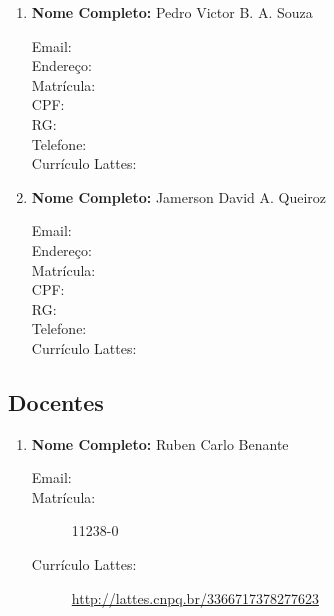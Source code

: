 \documentclass[a4paper,12pt]{article} %
\begin{document}
\begin{enumerate}
    \item \textbf{Nome Completo:} Pedro Victor B. A. Souza
    \begin{description}
        \item [Email:] 
        \item [Endereço:]
        \item [Matrícula:]
        \item [CPF:]
        \item [RG:]
        \item [Telefone:]
        \item [Currículo Lattes:]
    \end{description}

    \item \textbf{Nome Completo:} Jamerson David A. Queiroz
    \begin{description}
        \item [Email:] 
        \item [Endereço:]
        \item [Matrícula:]
        \item [CPF:]
        \item [RG:]
        \item [Telefone:]
        \item [Currículo Lattes:]
    \end{description}
\end{enumerate}

\subsection*{Docentes}

\begin{enumerate}
    \item \textbf{Nome Completo:} Ruben Carlo Benante
    \begin{description}
        \item [Email:] 
        \item [Matrícula:] 11238-0
        \item [Currículo Lattes:] \url{http://lattes.cnpq.br/3366717378277623}
    \end{description}
\end{enumerate}

\nocite{*}


\end{document}
